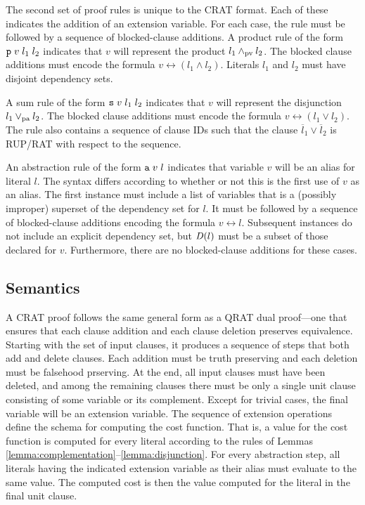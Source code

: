 \documentclass{llncs}
\newcommand{\pand}{\mathbin{\land_{\rm pv}}}
\newcommand{\por}{\mathbin{\lor_{\rm pa}}}
\newcommand{\obar}[1]{\overline{#1}}
\newcommand{\depend}{{\it D}}
\begin{document}
The second set of proof rules is unique to the CRAT format.  Each of
these indicates the addition of an extension variable.  For each case,
the rule must be followed by a sequence of blocked-clause additions.
A product rule of the form ${\tt p}\;v\;l_1\;l_2$ indicates that $v$
will represent the product $l_1 \pand l_2$.  The blocked clause
additions must encode the formula $v \leftrightarrow (l_1 \land l_2)$.
Literals $l_1$ and $l_2$ must have disjoint dependency sets.

A sum rule of the form ${\tt s}\;v\;l_1\;l_2$ indicates that $v$ will
represent the disjunction $l_1 \por l_2$.  The blocked clause
additions must encode the formula $v \leftrightarrow (l_1 \lor l_2)$.
The rule also contains a sequence of clause IDs such that the clause
$\obar{l}_1 \lor \obar{l}_2$ is RUP/RAT with respect to the sequence.

An abstraction rule of the form ${\tt a}\;v\;l$ indicates that
variable $v$ will be an alias for literal $l$.  The syntax differs
according to whether or not this is the first use of $v$ as an
alias.  The first instance must include a list of variables that is a
(possibly improper) superset of the dependency set for $l$.  It must
be followed by a sequence of blocked-clause additions encoding the
formula $v \leftrightarrow l$.  Subsequent instances do not
include an explicit dependency set, but $\depend(l)$ must be a subset of
those declared for $v$.  Furthermore, there are no blocked-clause
additions for these cases.


\subsection{Semantics}

A CRAT proof follows the same general form as a QRAT dual proof---one
that ensures that each clause addition and each clause deletion preserves
equivalence.  Starting with the set of input clauses, it produces a
sequence of steps that both add and delete clauses.  Each addition
must be truth preserving and each deletion must be falsehood
prserving.  At the end, all input clauses must have been deleted, and
among the remaining clauses there must be only a single unit clause consisting of some variable or
its complement.  Except for trivial cases, the final variable will be
an extension variable.  The sequence of extension operations define
the schema for computing the cost function.  That is, a value for the
cost function is computed for every literal according to the rules of
Lemmas \ref{lemma:complementation}--\ref{lemma:disjunction}.  For
every abstraction step, all literals having the indicated extension
variable as their alias must evaluate to the same value.  The computed
cost is then the value computed for the literal in the final unit
clause.
\end{document}
